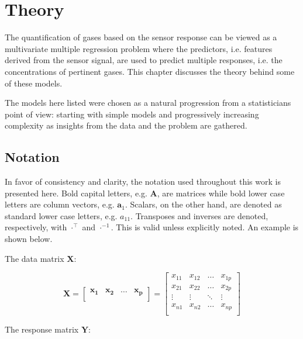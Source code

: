 \chapter{Theory}
\label{cha:theory}

The quantification of gases based on the sensor response can be viewed as a multivariate multiple regression problem where the predictors, i.e. features derived from the sensor signal, are used to predict multiple responses, i.e. the concentrations of pertinent gases. This chapter discusses the theory behind some of these models.

The models here listed were chosen as a natural progression from a statisticians point of view: starting with simple models and progressively increasing complexity as insights from the data and the problem are gathered.
\section{Notation}
\label{sec:notation}

In favor of consistency and clarity, the notation used throughout this work is presented here. Bold capital letters, e.g. $\mathbf{A}$, are matrices while bold lower case letters are column vectors, e.g. $\mathbf{a}_1$. Scalars, on the other hand, are denoted as standard lower case letters, e.g. $a_{11}$. Transposes and inverses are denoted, respectively, with $\cdot^\intercal $ and $\cdot^{-1}$. This is valid unless explicitly noted. An example is shown below.

The data matrix $\mathbf{X}$:

\begin{equation*}
	\mathbf{X} = 
	\begin{bmatrix}
		\mathbf{x_1} & \mathbf{x_2} &\dots &\mathbf{x_p}\\
	\end{bmatrix} 
	=
	\begin{bmatrix}
		
		x_{11} & x_{12} & \dots & x_{1p}\\
		x_{21} & x_{22} & \dots & x_{2p}\\
		\vdots  & \vdots & \ddots &\vdots\\
		x_{n1} & x_{n2} & \dots & x_{np}\\
	\end{bmatrix}
\end{equation*}

The response matrix $\mathbf{Y}$:

